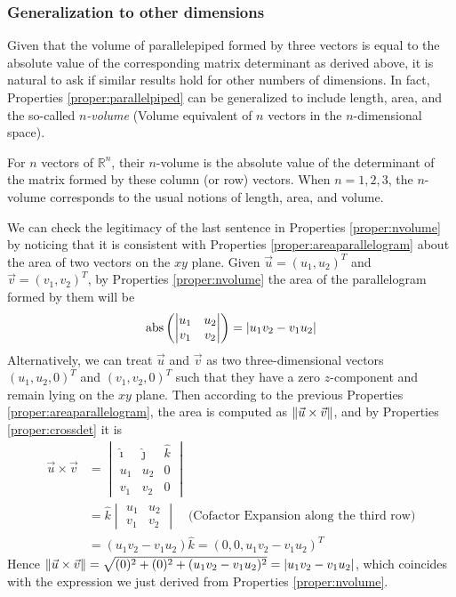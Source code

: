 \subsubsection{Generalization to other dimensions}
Given that the volume of parallelepiped formed by three vectors is equal to the absolute value of the corresponding matrix determinant as derived above, it is natural to ask if similar results hold for other numbers of dimensions. In fact, Properties \ref{proper:parallelpiped} can be generalized to include length, area, and the so-called \textit{$n$-volume} (Volume equivalent of $n$ vectors in the $n$-dimensional space).
\begin{proper}
\label{proper:nvolume}
For $n$ vectors of $\mathbb{R}^n$, their $n$-volume is the absolute value of the determinant of the matrix formed by these column (or row) vectors. When $n=1,2,3$, the $n$-volume corresponds to the usual notions of length, area, and volume.
\end{proper}
We can check the legitimacy of the last sentence in Properties \ref{proper:nvolume} by noticing that it is consistent with Properties \ref{proper:areaparallelogram} about the area of two vectors on the $xy$ plane. Given $\vec{u} = (u_1, u_2)^T$ and $\vec{v} = (v_1, v_2)^T$, by Properties \ref{proper:nvolume} the area of the parallelogram formed by them will be
\begin{align*}
\text{abs}\left(\begin{vmatrix}
u_1 & u_2 \\
v_1 & v_2
\end{vmatrix}\right) = \abs{u_1v_2 - v_1u_2}
\end{align*}
Alternatively, we can treat $\vec{u}$ and $\vec{v}$ as two three-dimensional vectors $(u_1, u_2, 0)^T$ and $(v_1, v_2, 0)^T$ such that they have a zero $z$-component and remain lying on the $xy$ plane. Then according to the previous Properties \ref{proper:areaparallelogram}, the area is computed as $\norm{\vec{u} \times \vec{v}}$, and by Properties \ref{proper:crossdet} it is
\begin{align*}
\vec{u} \times \vec{v} &= 
\begin{vmatrix}
\hat{\imath} & \hat{\jmath} & \hat{k} \\
u_1 & u_2 & 0 \\
v_1 & v_2 & 0
\end{vmatrix} \\
&= \hat{k}\begin{vmatrix}
u_1 & u_2 \\
v_1 & v_2
\end{vmatrix} \quad \text{(Cofactor Expansion along the third row)}\\
&= (u_1v_2 - v_1u_2)\hat{k} = (0,0,u_1v_2 - v_1u_2)^T
\end{align*}
Hence $\norm{\vec{u} \times \vec{v}} = \sqrt{(0)^2 + (0)^2 + (u_1v_2 - v_1u_2)^2} = \abs{u_1v_2 - v_1u_2}$, which coincides with the expression we just derived from Properties \ref{proper:nvolume}.

